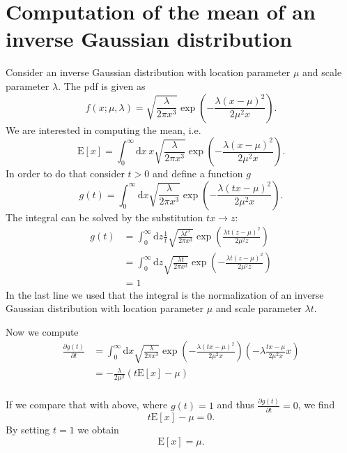 \documentclass{scrreprt}
\renewcommand{\d}{{\mathrm{d}}}
\begin{document}
\chapter*{Computation of the mean of an inverse Gaussian distribution}
Consider an inverse Gaussian distribution with location parameter $\mu$ and scale parameter $\lambda$. The pdf is given as
\begin{equation*}
 f(x;\mu ,\lambda )= \sqrt{\frac{\lambda }{2\pi x^{3}}} \exp \left(- \frac{\lambda (x-\mu )^{2}}{2\mu ^{2}x} \right).
\end{equation*}
We are interested in computing the mean, i.e.
\begin{equation*}
\mathrm{E}[x] = \int_{0}^{\infty}\d x\,x\sqrt{\frac{\lambda }{2\pi x^{3}}} \exp \left(- \frac{\lambda (x-\mu )^{2}}{2\mu ^{2}x} \right).
\end{equation*}
In order to do that consider $t > 0$ and define a function $g$
\begin{equation*}
g(t) = \int_{0}^{\infty}\d x\sqrt{\frac{\lambda }{2\pi x^{3}}} \exp \left( -\frac{\lambda (tx-\mu )^{2}}{2\mu ^{2}x} \right).
\end{equation*}
The integral can be solved by the substitution $tx \rightarrow z$:
\begin{align*}
g(t)&=\int_{0}^{\infty}\d z\frac{1}{t}\sqrt{\frac{\lambda t^3}{2\pi x^{3}}} \exp \left( \frac{\lambda t(z-\mu )^{2}}{2\mu ^{2}z} \right)\\
&=\int_{0}^{\infty}\d z\sqrt{\frac{\lambda t}{2\pi x^{3}}} \exp \left( -\frac{\lambda t(z-\mu )^{2}}{2\mu ^{2}z} \right)\\
&=1
\end{align*}
In the last line we used that the integral is the normalization of an inverse Gaussian distribution with location parameter $\mu$ and scale parameter $\lambda t$.

Now we compute 
\begin{align*}
\frac{\partial g(t)}{\partial t}&=\int_{0}^{\infty}\d x\sqrt{\frac{\lambda }{2\pi x^{3}}} \exp \left(- \frac{\lambda (tx-\mu )^{2}}{2\mu ^{2}x} \right)\left(- \lambda\frac{tx-\mu}{2 \mu^2 x}x\right)\\
&=-\frac{\lambda}{2 \mu^2}\left(t\mathrm{E}[x]-\mu\right)\\
\end{align*}

If we compare that with above, where $g(t) = 1 $ and thus  $\frac{\partial g(t)}{\partial t}=0$, we find
\begin{equation*}
t\mathrm{E}[x]-\mu = 0.
\end{equation*}
By setting $t = 1$ we obtain
\begin{equation*}
\mathrm{E}[x] = \mu.
\end{equation*}
\end{document}
